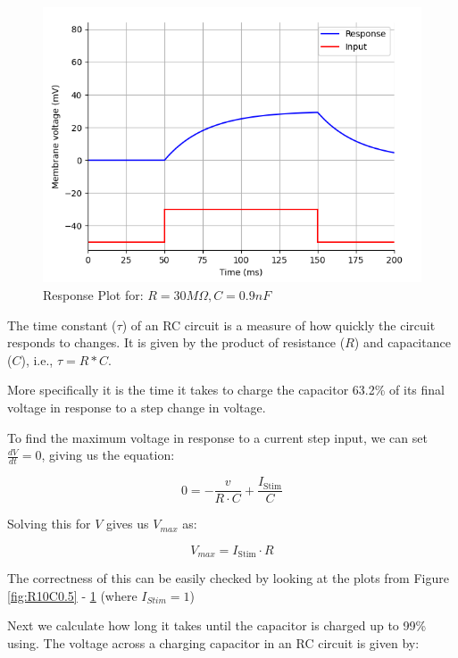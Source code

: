 \documentclass{article}
\begin{document}
\begin{figure}[htbp]
\begin{minipage}[b]{0.3\textwidth}
        \end{minipage}
        \hfill
        \begin{minipage}[b]{0.3\textwidth}
            \includegraphics[width=\textwidth]{R30C0.9.png}
            \caption{Response Plot for: $R = 30 M\Omega, C = 0.9nF$}
            \label{fig:R30C0.9}
        \end{minipage}
    \end{figure}

    The time constant ($\tau$) of an RC circuit is a measure of how quickly the circuit responds to changes.
    It is given by the product of resistance ($R$) and capacitance ($C$), i.e., $\tau = R * C$.

    More specifically it is the time it takes to charge the capacitor 63.2\% of its final voltage in response to a step change in voltage.

    To find the maximum voltage in response to a current step input, we can set $\frac{dV}{dt} = 0$, giving us the equation:

    \[ 0 = -\frac{v}{R \cdot C} + \frac{I_{\text{Stim}}}{C} \]

    Solving this for $V$ gives us $V_{max}$ as:

    \[ V_{max} = I_{\text{Stim}} \cdot R \]

    The correctness of this can be easily checked by looking at the plots from Figure \ref{fig:R10C0.5} - \ref{fig:R30C0.9} (where $I_{Stim} = 1$)

    Next we calculate how long it takes until the capacitor is charged up to 99\% using.
    The voltage across a charging capacitor in an RC circuit is given by:
\end{document}
